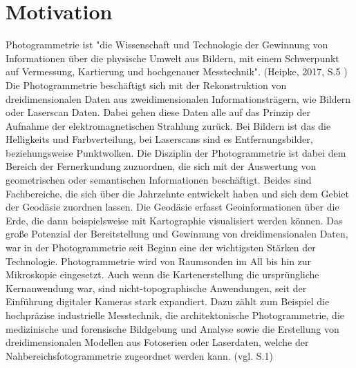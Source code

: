 \chapter{Motivation}

Photogrammetrie ist "die Wissenschaft und Technologie der Gewinnung von Informationen
über die physische Umwelt aus Bildern, mit einem Schwerpunkt auf Vermessung,
Kartierung und hochgenauer Messtechnik". (Heipke, 2017, S.5 \cite{photo})  Die Photogrammetrie beschäftigt sich  mit der Rekonstruktion von dreidimensionalen Daten aus zweidimensionalen Informationsträgern, wie Bildern oder Laserscan Daten. Dabei gehen diese Daten alle auf das Prinzip der Aufnahme der elektromagnetischen Strahlung zurück. Bei Bildern ist das die Helligkeits und Farbverteilung, bei Laserscans sind es Entfernungsbilder, beziehungsweise Punktwolken. Die Disziplin der Photogrammetrie ist dabei dem Bereich der Fernerkundung zuzuordnen, die sich mit der Auswertung von geometrischen oder semantischen Informationen beschäftigt. Beides sind Fachbereiche, die sich über die Jahrzehnte entwickelt haben und sich dem Gebiet der Geodäsie zuordnen lassen. Die Geodäsie erfasst Geoinformationen über die Erde, die dann beispielsweise mit Kartographie visualisiert werden können. Das große Potenzial der Bereitstellung und Gewinnung von dreidimensionalen Daten, war in der Photogrammetrie seit Beginn eine der wichtigsten Stärken der Technologie. Photogrammetrie wird von Raumsonden im All bis hin zur Mikroskopie eingesetzt. Auch wenn die Kartenerstellung die ursprüngliche Kernanwendung war, sind nicht-topographische Anwendungen, seit der Einführung digitaler Kameras stark expandiert. Dazu zählt zum Beispiel die hochpräzise industrielle Messtechnik, die architektonische Photogrammetrie, die medizinische und forensische Bildgebung und Analyse sowie die Erstellung von dreidimensionalen Modellen aus Fotoserien oder Laserdaten, welche der Nahbereichsfotogrammetrie zugeordnet werden kann. (vgl. \cite{state_of_art} S.1)


